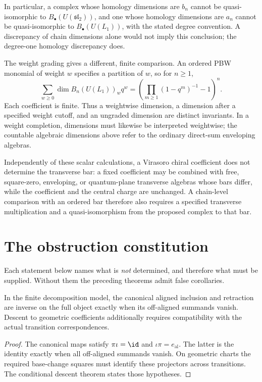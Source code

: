 In particular, a complex whose homology dimensions are $b_n$ cannot be
quasi-isomorphic to $B_\bullet(U(\mathfrak{sl}_2))$, and one whose homology
dimensions are $a_n$ cannot be quasi-isomorphic to $B_\bullet(U(L_1))$,
with the stated degree convention.  A discrepancy of chain dimensions
alone would not imply this conclusion; the degree-one homology discrepancy
does.

The weight grading gives a different, finite comparison.  An ordered PBW
monomial of weight $w$ specifies a partition of $w$, so for $n\ge1$,
\[
 \sum_{w\ge0}\dim B_n(U(L_1))_w q^w
 =\left(\prod_{m\ge1}(1-q^m)^{-1}-1\right)^n.
\]
Each coefficient is finite.  Thus a weightwise dimension, a dimension
after a specified weight cutoff, and an ungraded dimension are distinct
invariants.  In a weight completion, dimensions must likewise be interpreted
weightwise; the countable algebraic dimensions above refer to the ordinary
direct-sum enveloping algebras.

\begin{remark}
Independently of these scalar calculations, a Virasoro chiral coefficient does not determine the transverse bar: a fixed coefficient may be combined with free, square-zero, enveloping, or quantum-plane transverse algebras whose bars differ, while the coefficient and the central charge are unchanged. A chain-level comparison with an ordered bar therefore also requires a specified transverse multiplication and a quasi-isomorphism from the proposed complex to that bar.
\end{remark}

\chapter{The obstruction constitution}
\label{ch:obstructions}

Each statement below names what is \emph{not} determined, and therefore what
must be supplied. Without them the preceding theorems admit false corollaries.

\begin{proposition}
\label{prop:lambda-sector-spine}
In the finite decomposition model, the canonical aligned inclusion and
retraction are inverse on the full object exactly when its off-aligned
summands vanish. Descent to geometric coefficients additionally requires
compatibility with the actual transition correspondences.
\end{proposition}
\begin{proof}
The canonical maps satisfy $\pi\iota=\id$ and
$\iota\pi=e_{\mathrm{al}}$. The latter is the identity exactly when all
off-aligned summands vanish. On geometric charts the required
base-change squares must identify these projectors across transitions.
The conditional descent theorem states those hypotheses.
\end{proof}

